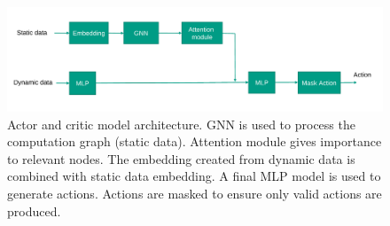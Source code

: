 \begin{figure}[h]
  \centering
  \includegraphics[width=\linewidth]{fig/model.pdf}
  \caption{Actor and critic model architecture. GNN is used to process the computation graph (static data). 
  Attention module gives importance to relevant nodes. The embedding created from dynamic data is combined with static data embedding. 
  A final MLP model is used to generate actions. Actions are masked to ensure only valid actions are produced. }
  \label{fig:model}
\end{figure}

